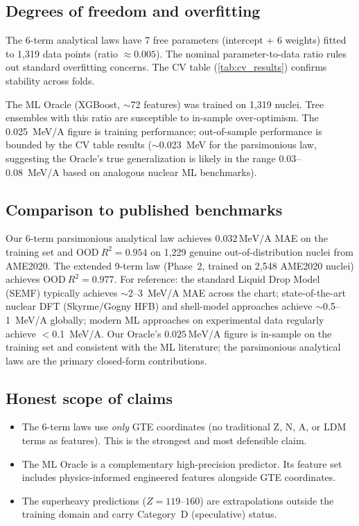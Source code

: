 \documentclass[9pt,twocolumn]{extarticle}
\begin{document}
\subsection{Degrees of freedom and overfitting}

The 6-term analytical laws have 7 free parameters (intercept + 6 weights) fitted to 1,319 data points (ratio $\approx 0.005$). The nominal parameter-to-data ratio rules out standard overfitting concerns. The CV table (\cref{tab:cv_results}) confirms stability across folds.

The ML Oracle (XGBoost, $\sim$72 features) was trained on 1,319 nuclei. Tree ensembles with this ratio are susceptible to in-sample over-optimism. The 0.025~MeV/A figure is training performance; out-of-sample performance is bounded by the CV table results ($\sim$0.023~MeV for the parsimonious law, suggesting the Oracle's true generalization is likely in the range 0.03--0.08~MeV/A based on analogous nuclear ML benchmarks).

\subsection{Comparison to published benchmarks}

Our 6-term parsimonious analytical law achieves $0.032\,\mathrm{MeV/A}$ MAE on the training set and $\mathrm{OOD}\ R^2 = 0.954$ on 1,229 genuine out-of-distribution nuclei from AME2020.
The extended 9-term law (Phase~2, trained on 2,548 AME2020 nuclei) achieves $\mathrm{OOD}\ R^2 = 0.977$.
For reference: the standard Liquid Drop Model (SEMF) typically achieves $\sim$2--3~MeV/A MAE across the chart; state-of-the-art nuclear DFT (Skyrme/Gogny HFB) and shell-model approaches achieve $\sim$0.5--1~MeV/A globally; modern ML approaches on experimental data regularly achieve $<$0.1~MeV/A.
Our Oracle's $0.025\,\mathrm{MeV/A}$ figure is in-sample on the training set and consistent with the ML literature; the parsimonious analytical laws are the primary closed-form contributions.

\subsection{Honest scope of claims}

\begin{itemize}[nosep]
\item The 6-term laws use \emph{only} GTE coordinates (no traditional Z, N, A, or LDM terms as features). This is the strongest and most defensible claim.
\item The ML Oracle is a complementary high-precision predictor. Its feature set includes physics-informed engineered features alongside GTE coordinates.
\item The superheavy predictions ($Z=119$--$160$) are extrapolations outside the training domain and carry Category~D (speculative) status.
\end{itemize}
\end{document}
